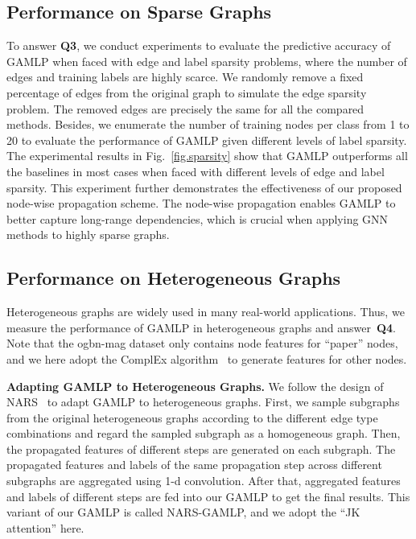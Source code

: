 \documentclass[sigconf]{acmart}
\begin{document}
\subsection{Performance on Sparse Graphs}
To answer \textbf{Q3}, we conduct experiments to evaluate the predictive accuracy of GAMLP when faced with edge and label sparsity problems, where the number of edges and training labels are highly scarce.
We randomly remove a fixed percentage of edges from the original graph to simulate the edge sparsity problem.
The removed edges are precisely the same for all the compared methods.
Besides, we enumerate the number of training nodes per class from 1 to 20 to evaluate the performance of GAMLP given different levels of label sparsity.
The experimental results in Fig.~\ref{fig.sparsity} show that GAMLP outperforms all the baselines in most cases when faced with different levels of edge and label sparsity.
This experiment further demonstrates the effectiveness of our proposed node-wise propagation scheme.
The node-wise propagation enables GAMLP to better capture long-range dependencies, which is crucial when applying GNN methods to highly sparse graphs.

\subsection{Performance on Heterogeneous Graphs}
Heterogeneous graphs are widely used in many real-world applications. Thus, we measure the performance of GAMLP in heterogeneous graphs and answer~\textbf{Q4}. Note that the ogbn-mag dataset only contains node features for ``paper'' nodes, and we here adopt the ComplEx algorithm~\citep{trouillon2017knowledge} to generate features for other nodes.
 
\noindent\textbf{Adapting GAMLP to Heterogeneous Graphs.}
We follow the design of NARS~\cite{yu2020scalable} to adapt GAMLP to heterogeneous graphs.
First, we sample subgraphs from the original heterogeneous graphs according to the different edge type combinations and regard the sampled subgraph as a homogeneous graph.
Then, the propagated features of different steps are generated on each subgraph.
The propagated features and labels of the same propagation step across different subgraphs are aggregated using 1-d convolution.
After that, aggregated features and labels of different steps are fed into our GAMLP to get the final results.
This variant of our GAMLP is called NARS-GAMLP, and we adopt the ``JK attention'' here.
\end{document}
